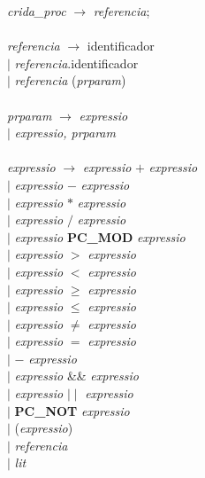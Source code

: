 \begin{tabbing}
        \textit{crida\_proc} \> $\rightarrow$ \> \textit{referencia}; \\
        \\
        \textit{referencia} \> $\rightarrow$ \> identificador \\
        \> $\mid$ \> \textit{referencia}.identificador \\
        \> $\mid$ \> \textit{referencia} (\textit{prparam}) \\
        \\
        \textit{prparam} \> $\rightarrow$ \> \textit{expressio} \\
        \> $\mid$ \> \textit{expressio, prparam} \\
        \\
        
        \textit{expressio} \> $\rightarrow$ \> \textit{expressio} $ + $ \textit{expressio} \\
        \> $\mid$ \> \textit{expressio} $ - $ \textit{expressio} \\
        \> $\mid$ \> \textit{expressio} $ * $ \textit{expressio} \\
        \> $\mid$ \> \textit{expressio} $ / $ \textit{expressio} \\
        \> $\mid$ \> \textit{expressio} \textbf{PC\_MOD} \textit{expressio} \\
        \> $\mid$ \> \textit{expressio} $ > $ \textit{expressio} \\
        \> $\mid$ \> \textit{expressio} $ < $ \textit{expressio} \\
        \> $\mid$ \> \textit{expressio} $ \geq $ \textit{expressio} \\
        \> $\mid$ \> \textit{expressio} $ \leq $ \textit{expressio} \\
        \> $\mid$ \> \textit{expressio} $ \neq $ \textit{expressio} \\
        \> $\mid$ \> \textit{expressio} $ = $ \textit{expressio} \\
        \> $\mid$ \> $-$ \textit{expressio} \\
        \> $\mid$ \> \textit{expressio} \&\& \textit{expressio} \\
        \> $\mid$ \> \textit{expressio} $\mid\mid$ \textit{expressio} \\
        \> $\mid$ \> \textbf{PC\_NOT} \textit{expressio} \\
        \> $\mid$ \> (\textit{expressio}) \\
        \> $\mid$ \> \textit{referencia} \\
        \> $\mid$ \> \textit{lit} \\
    \end{tabbing}
